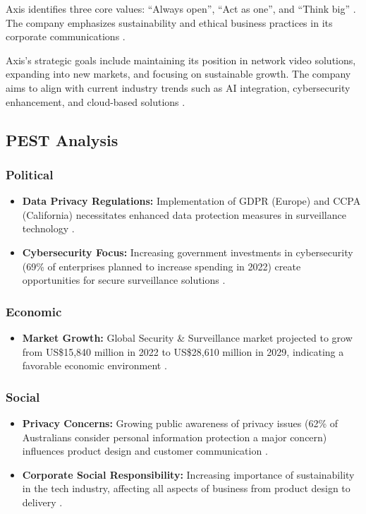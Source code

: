 \documentclass{article}
\begin{document}
Axis identifies three core values: \enquote{Always open}, \enquote{Act as one}, and \enquote{Think big} \cite{axis_sustainability2023}. The company emphasizes sustainability and ethical business practices in its corporate communications \cite{axis_sustainability2023}. 

Axis's strategic goals include maintaining its position in network video solutions, expanding into new markets, and focusing on sustainable growth. The company aims to align with current industry trends such as AI integration, cybersecurity enhancement, and cloud-based solutions \cite{axis_trends2022}.


\subsection{PEST Analysis}

\subsubsection{Political}
\begin{itemize}
    \item \textbf{Data Privacy Regulations:} Implementation of GDPR (Europe) and CCPA (California) necessitates enhanced data protection measures in surveillance technology \cite{iapp2023}.
    \item \textbf{Cybersecurity Focus:} Increasing government investments in cybersecurity (69\% of enterprises planned to increase spending in 2022) create opportunities for secure surveillance solutions \cite{aipix2023}.
\end{itemize}

\subsubsection{Economic}
\begin{itemize}
    \item \textbf{Market Growth:} Global Security \& Surveillance market projected to grow from US\$15,840 million in 2022 to US\$28,610 million in 2029, indicating a favorable economic environment \cite{mckinsey2023}.
\end{itemize}

\subsubsection{Social}
\begin{itemize}
    \item \textbf{Privacy Concerns:} Growing public awareness of privacy issues (62\% of Australians consider personal information protection a major concern) influences product design and customer communication \cite{iapp2023}.
    \item \textbf{Corporate Social Responsibility:} Increasing importance of sustainability in the tech industry, affecting all aspects of business from product design to delivery \cite{axis2022}.
\end{itemize}
\end{document}
